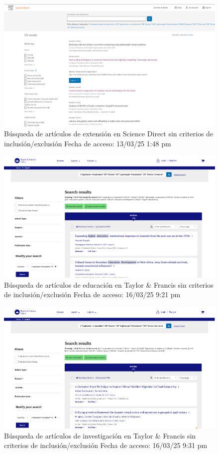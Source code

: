 \FloatBarrier\begin{figure}[H]
    \centering
    \includegraphics[width=\textwidth,keepaspectratio]{apendices/BD/sin-criterios/SD-ind.png}
    \caption{Búsqueda de artículos de extensión en Science Direct sin criterios de inclusión/exclusión
    Fecha de acceso: 13/03/25 1:48 pm}
\end{figure}
\FloatBarrier\begin{figure}[H]
    \centering
    \includegraphics[width=\textwidth,keepaspectratio]{apendices/BD/sin-criterios/TF-ed.png}
    \caption{Búsqueda de artículos de educación en Taylor \& Francis sin criterios de inclusión/exclusión
    Fecha de acceso: 16/03/25 9:21 pm}
\end{figure}
\FloatBarrier\begin{figure}[H]
    \centering
    \includegraphics[width=\textwidth,keepaspectratio]{apendices/BD/sin-criterios/TF-inv.png}
    \caption{Búsqueda de artículos de investigación en Taylor \& Francis sin criterios de inclusión/exclusión
    Fecha de acceso: 16/03/25 9:31 pm
    }
\end{figure}
